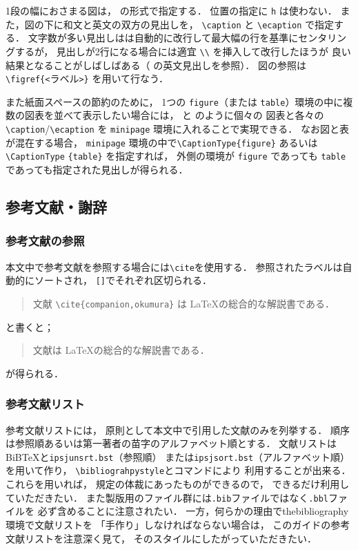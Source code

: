\documentclass[submit,noauthor]{ono}
\def\|{\verb|}
\begin{document}
1段の幅におさまる図は，
 の形式で指定する．
位置の指定に \|h| は使わない．
また，図の下に和文と英文の双方の見出しを，
\|\caption| と \|\ecaption| で指定する．
文字数が多い見出しはは自動的に改行して最大幅の行を基準にセンタリングするが，
見出しが2行になる場合には適宜 \|\\| を挿入して改行したほうが
良い結果となることがしばしばある（ の英文見出しを参照）．
図の参照は \|\figref{<|ラベル\|>}| を用いて行なう．


また紙面スペースの節約のために，
1つの \|figure|（または \|table|）環境の中に複数の図表を並べて表示したい場合には，
 と  のように個々の
図表と各々の \|\caption|/\|\ecaption| を \|minipage| 環境に入れることで実現できる．
なお図と表が混在する場合，
\|minipage| 環境の中で\|\CaptionType{figure}| あるいは \|\CaptionType| \|{table}| を指定すれば，
外側の環境が \|figure| であっても \|table| であっても指定された見出しが得られる．



\subsection{参考文献・謝辞}

\subsubsection{参考文献の参照}

本文中で参考文献を参照する場合には\|\cite|を使用する．
参照されたラベルは自動的にソートされ，
\|[]|でそれぞれ区切られる．
%
\begin{quote}
	文献 \|\cite{companion,okumura}| は \LaTeX の総合的な解説書である．
\end{quote}
%
と書くと；
%
\begin{quote}
	文献\cite{companion,okumura}は \LaTeX の総合的な解説書である．
\end{quote}
%
が得られる．

\subsubsection{参考文献リスト}
参考文献リストには，
原則として本文中で引用した文献のみを列挙する．
順序は参照順あるいは第一著者の苗字のアルファベット順とする．
文献リストはBiB\TeX と\verb+ipsjunsrt.bst+（参照順）
または\verb+ipsjsort.bst+（アルファベット順）を用いて作り，
\verb+\bibliograhpystyle+と\verb++コマンドにより
利用することが出来る．
これらを用いれば，
規定の体裁にあったものができるので，
できるだけ利用していただきたい．
また製版用のファイル群には\verb+.bib+ファイルではなく\verb+.bbl+ファイルを
必ず含めることに注意されたい．
一方，何らかの理由でthebibliography環境で文献リストを
「手作り」しなければならない場合は，
このガイドの参考文献リストを注意深く見て，
そのスタイルにしたがっていただきたい．
\end{document}
